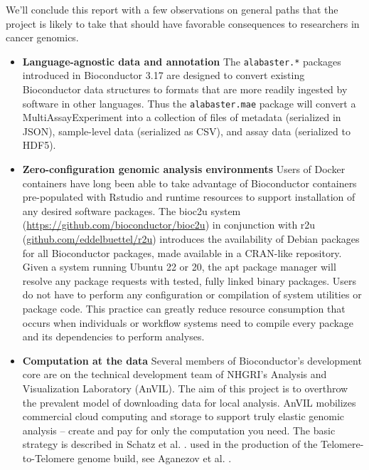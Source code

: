 \documentclass[graybox]{svmult}
\begin{document}
We'll conclude this report with a few observations on
general paths that the project is likely to take that
should have favorable consequences to researchers in
cancer genomics.

\begin{itemize}
\item
  \textbf{Language-agnostic data and annotation} The \texttt{alabaster.*} packages
  introduced in Bioconductor 3.17 are designed to convert existing
  Bioconductor data structures to formats that are more readily ingested
  by software in other languages. Thus the \texttt{alabaster.mae}
  package will convert a MultiAssayExperiment into a collection
  of files of metadata (serialized in JSON), sample-level data
  (serialized as CSV), and assay data (serialized to HDF5).
\item
  \textbf{Zero-configuration genomic analysis environments} Users
  of Docker containers have long been able to take advantage of
  Bioconductor containers pre-populated with Rstudio and runtime
  resources to support installation of any desired software packages.
  The bioc2u system (\url{https://github.com/bioconductor/bioc2u}) in conjunction
  with r2u (\url{github.com/eddelbuettel/r2u}) introduces the
  availability of Debian packages for all Bioconductor packages,
  made available in a CRAN-like repository. Given a system running
  Ubuntu 22 or 20, the apt package manager will resolve any package
  requests with tested, fully linked binary packages. Users do not
  have to perform any configuration or compilation of system
  utilities or package code. This practice can greatly reduce
  resource consumption that occurs when individuals or
  workflow systems need to compile
  every package and its dependencies to perform analyses.
\item
  \textbf{Computation at the data} Several members of Bioconductor's
  development core are on the technical development team of
  NHGRI's Analysis and Visualization Laboratory (AnVIL). The aim
  of this project is to overthrow the prevalent model of downloading data for
  local analysis. AnVIL mobilizes commercial cloud computing and
  storage to support truly elastic genomic analysis -- create and
  pay for only the computation you need. The basic
  strategy is described in Schatz et al. \cite{Schatz2022}.%
  used in the production of the Telomere-to-Telomere
  genome build, see Aganezov et al. \cite{Aganezov2022}.%
\end{itemize}
\end{document}

